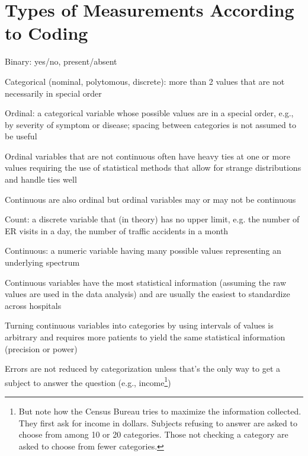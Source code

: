 \section{Types of Measurements According to Coding}  
\bi
 \item Binary: yes/no, present/absent
 \item Categorical (nominal, polytomous, discrete): more than 2 values
   that are not necessarily in special order
 \item Ordinal: a categorical variable whose possible values are in a
   special order, e.g., by severity of symptom or disease; spacing
   between categories is not assumed to be useful
  \bi
  \item Ordinal variables that are not continuous often have heavy
    ties at one or more values requiring the use of statistical
    methods that allow for strange distributions and handle ties well
  \item Continuous are also ordinal but ordinal variables may or may
    not be continuous
  \ei
 \item Count: a discrete variable that (in theory) has no upper limit, e.g. the number of ER visits in a day, the number of traffic accidents in a month
 \item Continuous: a numeric variable having many possible values
   representing an underlying spectrum
 \item Continuous variables have the most statistical information
  (assuming the raw values are used in the data analysis) and
  are usually the easiest to standardize across hospitals
 \item Turning continuous variables
  into categories by using intervals of values is arbitrary and
  requires more patients to yield the same statistical information
  (precision or power)
 \item Errors are not reduced by categorization unless that's the only
   way to get a subject to answer the question (e.g.,
 income\footnote{But note how the Census Bureau tries to maximize the
 information collected.  They first ask for income in
 dollars.  Subjects refusing to answer are asked to choose from among
 10 or 20 categories.  Those not checking a category are asked to
 choose from fewer categories.})
\ei

